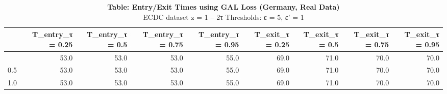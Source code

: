 \begin{table}[t]
\caption*{
{\large \textbf{Table: Entry/Exit Times using GAL Loss (Germany, Real Data)}} \\ 
{\small ECDC dataset \textbar{} z = 1 -- 2τ \textbar{} Thresholds: ε = 5, ε' = 1}
} 
\begin{tabular*}{\linewidth}{@{\extracolsep{\fill}}l|rrrrrrrr}
\toprule
 & T\_entry\_τ = 0.25 & T\_entry\_τ = 0.5 & T\_entry\_τ = 0.75 & T\_entry\_τ = 0.95 & T\_exit\_τ = 0.25 & T\_exit\_τ = 0.5 & T\_exit\_τ = 0.75 & T\_exit\_τ = 0.95 \\ 
\midrule\addlinespace[2.5pt]
0.1 & 53.0 & 53.0 & 53.0 & 55.0 & 69.0 & 71.0 & 70.0 & 70.0 \\ 
0.5 & 53.0 & 53.0 & 53.0 & 55.0 & 69.0 & 71.0 & 70.0 & 70.0 \\ 
1.0 & 53.0 & 53.0 & 53.0 & 55.0 & 69.0 & 71.0 & 70.0 & 70.0 \\ 
\bottomrule
\end{tabular*}
\end{table}

